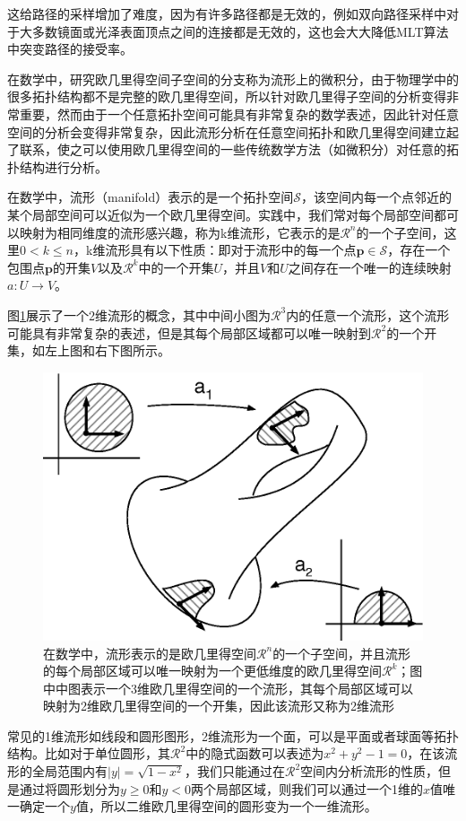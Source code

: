 这给路径的采样增加了难度，因为有许多路径都是无效的，例如双向路径采样中对于大多数镜面或光泽表面顶点之间的连接都是无效的，这也会大大降低MLT算法中突变路径的接受率。

在数学中，研究欧几里得空间子空间的分支称为流形上的微积分\cite{b:CalculusonManifolds:AModernApproachtoClassicalTheoremsofAdvancedCalculus,b:AnalysisOnManifolds}，由于物理学中的很多拓扑结构都不是完整的欧几里得空间，所以针对欧几里得子空间的分析变得非常重要，然而由于一个任意拓扑空间可能具有非常复杂的数学表述，因此针对任意空间的分析会变得非常复杂，因此流形分析在任意空间拓扑和欧几里得空间建立起了联系，使之可以使用欧几里得空间的一些传统数学方法（如微积分）对任意的拓扑结构进行分析。

在数学中，流形（manifold）表示的是一个拓扑空间$\mathcal{S}$，该空间内每一个点邻近的某个局部空间可以近似为一个欧几里得空间。实践中，我们常对每个局部空间都可以映射为相同维度的流形感兴趣，称为k维流形，它表示的是$\mathcal{R}^{n}$的一个子空间，这里$0<k\leq n$，k维流形具有以下性质：即对于流形中的每一个点$\mathbf{p}\in\mathcal{S}$，存在一个包围点$\mathbf{p}$的开集$V$以及$\mathcal{R}^{k}$中的一个开集$U$，并且$V$和$U$之间存在一个唯一的连续映射$a:U\to V$。

图\ref{f:mlt-manifolds}展示了一个2维流形的概念，其中中间小图为$\mathcal{R}^{3}$内的任意一个流形，这个流形可能具有非常复杂的表述，但是其每个局部区域都可以唯一映射到$\mathcal{R}^{2}$的一个开集，如左上图和右下图所示。

\begin{figure}
\sidecaption
	\includegraphics[width=.55\textwidth]{figures/mlt/manifolds}
	\caption{在数学中，流形表示的是欧几里得空间$\mathcal{R}^{n}$的一个子空间，并且流形的每个局部区域可以唯一映射为一个更低维度的欧几里得空间$\mathcal{R}^{k}$；图中中图表示一个3维欧几里得空间的一个流形，其每个局部区域可以映射为2维欧几里得空间的一个开集，因此该流形又称为2维流形}
	\label{f:mlt-manifolds}
\end{figure}

常见的1维流形如线段和圆形图形，2维流形为一个面，可以是平面或者球面等拓扑结构。比如对于单位圆形，其$\mathcal{R}^{2}$中的隐式函数可以表述为$x^{2}+y^{2}-1=0$，在该流形的全局范围内有$|y|=\sqrt{1-x^{2}}$，我们只能通过在$\mathcal{R}^{2}$空间内分析流形的性质，但是通过将圆形划分为$y\geq 0$和$y<0$两个局部区域，则我们可以通过一个1维的$x$值唯一确定一个$y$值，所以二维欧几里得空间的圆形变为一个一维流形。

